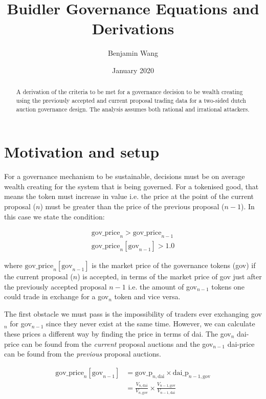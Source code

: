 \documentclass{article}
\title{Buidler Governance Equations and Derivations}
\author{Benjamin Wang}
\date{January 2020}
\begin{document}
\maketitle

\begin{abstract}
    A derivation of the criteria to be met for a governance decision to be wealth creating using the previously accepted and current proposal trading data for a two-sided dutch auction governance design. The analysis assumes both rational and irrational attackers.
\end{abstract}

\section{Motivation and setup}
For a governance mechanism to be sustainable, decisions must be on average wealth creating for the system that is being governed. For a tokenised good, that means the token must increase in value i.e. the price at the point of the current proposal ($n$) must be greater than the price of the previous proposal ($n-1$). In this case we state the condition:

\begin{align}
    \mathrm{gov\_price}_{n} > \mathrm{gov\_price}_{n-1}\\
    \mathrm{gov\_price}_{n}[\mathrm{gov}_{n-1}] > 1.0
\end{align}

where $\mathrm{gov\_price}_{n}[\mathrm{gov}_{n-1}]$ is the market price of the governance tokens (gov) if the current proposal ($n$) is accepted, in terms of the market price of gov just after the previously accepted proposal $n-1$ i.e. the amount of gov$_{n-1}$ tokens one could trade in exchange for a gov$_n$ token and vice versa.


The first obstacle we must pass is the impossibility of traders ever exchanging gov$_n$ for gov$_{n-1}$ since they never exist at the same time. However, we can calculate these prices a different way by finding the price in terms of dai. The gov$_n$ dai-price can be found from the \emph{current} proposal auctions and the gov$_{n-1}$ dai-price can be found from the \emph{previous} proposal auctions.


\begin{align}
    \mathrm{gov\_price}_{n}[\mathrm{gov}_{n-1}] &= \mathrm{gov\_p}_{n,\mathrm{dai}} \times \mathrm{dai\_p}_{n-1,\mathrm{gov}} \label{eqn:proposal_price}\\ 
           &= \frac{V_{n,\mathrm{dai}}}{V_{n,\mathrm{gov}}} \times \frac{V_{n-1,\mathrm{gov}}}{V_{n-1,\mathrm{dai}}}
\end{align}
\end{document}
